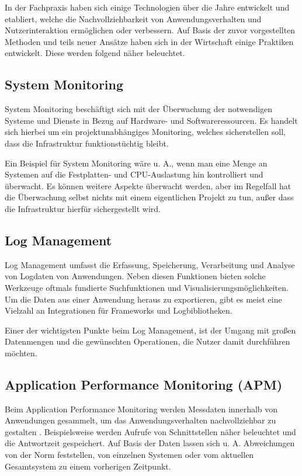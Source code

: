 In der Fachpraxis haben sich einige Technologien über die Jahre entwickelt und etabliert, welche die Nachvollziehbarkeit von Anwendungsverhalten und Nutzerinteraktion ermöglichen oder verbessern. Auf Basis der zuvor vorgestellten Methoden und teils neuer Ansätze haben sich in der Wirtschaft einige Praktiken entwickelt. Diese werden folgend näher beleuchtet.

\subsection{System Monitoring}

System Monitoring beschäftigt sich mit der Überwachung der notwendigen Systeme und Dienste in Bezug auf Hardware- und Softwareressourcen. Es handelt sich hierbei um ein projektunabhängiges Monitoring, welches sicherstellen soll, dass die Infrastruktur funktionstüchtig bleibt.

Ein Beispiel für System Monitoring wäre u. A., wenn man eine Menge an Systemen auf die Festplatten- und CPU-Auslastung hin kontrolliert und überwacht. Es können weitere Aspekte überwacht werden, aber im Regelfall hat die Überwachung selbst nichts mit einem eigentlichen Projekt zu tun, außer dass die Infrastruktur hierfür sichergestellt wird.

\subsection{Log Management}

Log Management umfasst die Erfassung, Speicherung, Verarbeitung und Analyse von Logdaten von Anwendungen. Neben diesen Funktionen bieten solche Werkzeuge oftmals fundierte Suchfunktionen und Visualisierungsmöglichkeiten. Um die Daten aus einer Anwendung heraus zu exportieren, gibt es meist eine Vielzahl an Integrationen für Frameworks und Logbibliotheken.

Einer der wichtigsten Punkte beim Log Management, ist der Umgang mit großen Datenmengen und die gewünschten Operationen, die Nutzer damit durchführen möchten.

\subsection{Application Performance Monitoring (APM)}

Beim Application Performance Monitoring werden Messdaten innerhalb von Anwendungen gesammelt, um das Anwendungsverhalten nachvollziehbar zu gestalten \cite{StudyingTheEffectivenessOfAPMTools}. Beispielsweise werden Aufrufe von Schnittstellen näher beleuchtet und die Antwortzeit gespeichert. Auf Basis der Daten lassen sich u. A. Abweichungen von der Norm feststellen, von einzelnen Systemen oder vom aktuellen Gesamtsystem zu einem vorherigen Zeitpunkt.

